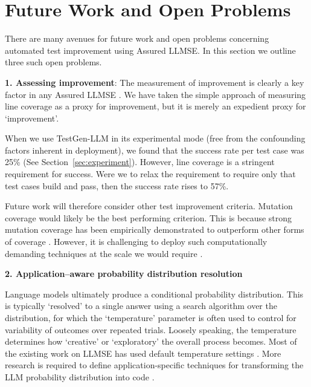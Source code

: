 \documentclass[sigconf,screen]{acmart}
\begin{document}
\section{Future Work and Open Problems}
\label{sec:future}
There are many avenues for future work and open problems concerning automated test improvement using Assured LLMSE.
In this section we outline three such open problems.

\medskip
\noindent
{\bf 
1. Assessing improvement}:
The measurement of improvement is clearly a key factor in any Assured LLMSE \cite{mhetal:intense24-keynote}.
We have taken the simple approach of measuring line coverage as a proxy for improvement, but it  is merely  an expedient proxy for `improvement'.

When we use TestGen-LLM in its experimental mode (free from the confounding factors inherent in deployment), 
we found that the success rate per test case was 25\% (See Section~\ref{sec:experiment}).
However, line coverage is a stringent requirement for success.
Were we to relax the requirement to  require only that test cases build and pass, then the success rate rises to 57\%.


Future work will therefore consider other test improvement criteria. 
Mutation coverage \cite{yjmh:analysis} would likely be the best performing criterion.
This is because strong mutation coverage has been empirically demonstrated to outperform other forms of coverage \cite{mike:icse17}.
However, it is challenging to deploy such computationally demanding techniques  at the scale we would require \cite{beller:what}.

\newpage
\noindent
{\bf 
2. Application–aware probability distribution resolution 
}

Language models ultimately produce a conditional probability distribution.
This is typically `resolved' to a single answer using a search algorithm over the distribution, for which the `temperature' parameter is often used to control for variability of outcomes over repeated trials.
Loosely speaking, the temperature determines how `creative' or `exploratory' the overall  process becomes.
Most of the existing work on LLMSE has used default temperature settings  \cite{mhetal:LLM-survey}.
More research is required to define application-specific techniques for transforming the LLM probability distribution into  code \cite{mhetal:intense24-keynote}.
\end{document}
